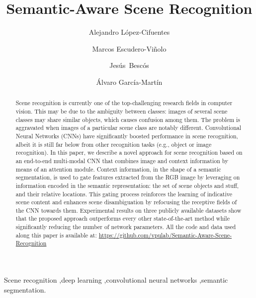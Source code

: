 \documentclass[review, 3p, sort&compress]{elsarticle}
\begin{document}
\begin{frontmatter}

\title{Semantic-Aware Scene Recognition}

\author[1]{Alejandro L\'{o}pez-Cifuentes}
\author[1]{Marcos Escudero-Vi\~nolo}
\author[1]{Jes\'{u}s~Besc\'{o}s}
\author[1]{\'{A}lvaro Garc\'{i}a-Mart\'{i}n}


\address[1]{Video Processing and Understanding Lab, Universidad Aut\'{o}noma de Madrid, 28049, Madrid, Spain}


\begin{abstract}

Scene recognition is currently one of the top-challenging research fields in computer vision. This may be due to the ambiguity between classes: images of several scene classes may share similar objects, which causes confusion among them. The problem is aggravated when images of a particular scene class are notably different. Convolutional Neural Networks (CNNs) have significantly boosted performance in scene recognition, albeit it is still far below from other recognition tasks (e.g., object or image recognition). In this paper, we describe a novel approach for scene recognition based on an end-to-end multi-modal CNN that combines image and context information by means of an attention module. Context information, in the shape of a semantic segmentation, is used to gate features extracted from the RGB image by leveraging on information encoded in the semantic representation: the set of scene objects and stuff, and their relative locations. This gating process reinforces the learning of indicative scene content and enhances scene disambiguation by refocusing the receptive fields of the CNN towards them. Experimental results on three publicly available datasets show that the proposed approach outperforms every other state-of-the-art method while significantly reducing the number of network parameters. All the code and data used along this paper is available at: \url{https://github.com/vpulab/Semantic-Aware-Scene-Recognition}
\end{abstract}

\begin{keyword}
Scene recognition \sep deep learning \sep convolutional neural networks \sep semantic segmentation.
\end{keyword}

\end{frontmatter}
\end{document}
